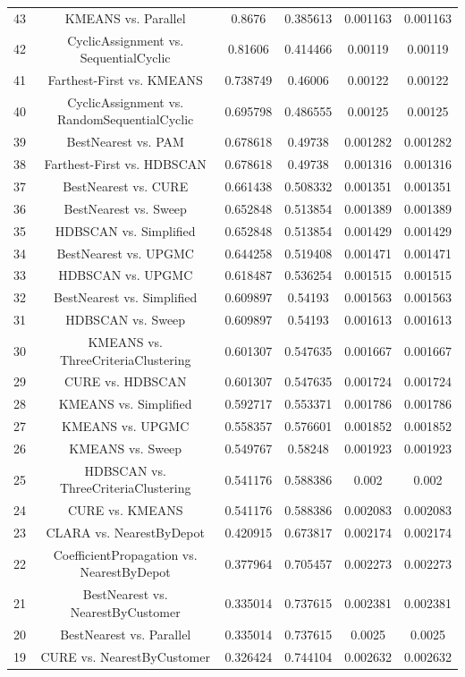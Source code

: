 \documentclass[a4paper,10pt]{article}
\begin{document}
\begin{landscape}
\begin{table}[!htp]
\begin{tabular}{cccccc}
43&KMEANS vs. Parallel&0.8676&0.385613&0.001163&0.001163\\
42&CyclicAssignment vs. SequentialCyclic&0.81606&0.414466&0.00119&0.00119\\
41&Farthest-First vs. KMEANS&0.738749&0.46006&0.00122&0.00122\\
40&CyclicAssignment vs. RandomSequentialCyclic&0.695798&0.486555&0.00125&0.00125\\
39&BestNearest vs. PAM&0.678618&0.49738&0.001282&0.001282\\
38&Farthest-First vs. HDBSCAN&0.678618&0.49738&0.001316&0.001316\\
37&BestNearest vs. CURE&0.661438&0.508332&0.001351&0.001351\\
36&BestNearest vs. Sweep&0.652848&0.513854&0.001389&0.001389\\
35&HDBSCAN vs. Simplified&0.652848&0.513854&0.001429&0.001429\\
34&BestNearest vs. UPGMC&0.644258&0.519408&0.001471&0.001471\\
33&HDBSCAN vs. UPGMC&0.618487&0.536254&0.001515&0.001515\\
32&BestNearest vs. Simplified&0.609897&0.54193&0.001563&0.001563\\
31&HDBSCAN vs. Sweep&0.609897&0.54193&0.001613&0.001613\\
30&KMEANS vs. ThreeCriteriaClustering&0.601307&0.547635&0.001667&0.001667\\
29&CURE vs. HDBSCAN&0.601307&0.547635&0.001724&0.001724\\
28&KMEANS vs. Simplified&0.592717&0.553371&0.001786&0.001786\\
27&KMEANS vs. UPGMC&0.558357&0.576601&0.001852&0.001852\\
26&KMEANS vs. Sweep&0.549767&0.58248&0.001923&0.001923\\
25&HDBSCAN vs. ThreeCriteriaClustering&0.541176&0.588386&0.002&0.002\\
24&CURE vs. KMEANS&0.541176&0.588386&0.002083&0.002083\\
23&CLARA vs. NearestByDepot&0.420915&0.673817&0.002174&0.002174\\
22&CoefficientPropagation vs. NearestByDepot&0.377964&0.705457&0.002273&0.002273\\
21&BestNearest vs. NearestByCustomer&0.335014&0.737615&0.002381&0.002381\\
20&BestNearest vs. Parallel&0.335014&0.737615&0.0025&0.0025\\
19&CURE vs. NearestByCustomer&0.326424&0.744104&0.002632&0.002632\\

\end{tabular}
\end{table}
\end{landscape}
\end{document}

